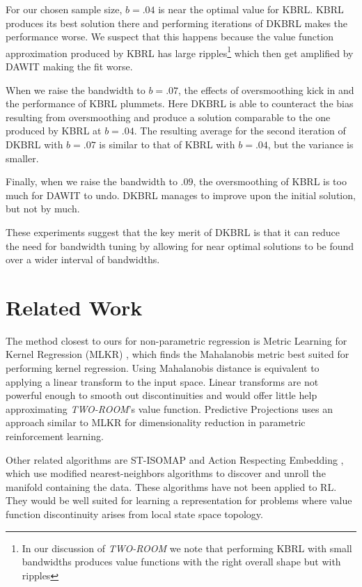 \documentclass{article} %
\begin{document}
For our chosen sample size, $b=.04$ is near the optimal value for KBRL.
KBRL produces its best solution there and performing iterations of DKBRL makes the performance worse.
We suspect that this happens because the value function approximation produced by
KBRL has large ripples\footnote{In our discussion of \textit{TWO-ROOM} we note that
performing KBRL with small bandwidths produces value functions with the right overall shape
but with ripples} which then get amplified by DAWIT making the fit worse.

When we raise the bandwidth to $b=.07$, the effects of oversmoothing kick in and the
performance of KBRL plummets. Here DKBRL is able to counteract the bias resulting from
oversmoothing and produce a solution comparable to the one produced by KBRL at $b=.04$.
The resulting average for the second iteration of DKBRL with $b=.07$ is similar to that of
KBRL with $b=.04$, but the variance is smaller.

Finally, when we raise the bandwidth to $.09$, the oversmoothing of KBRL is too much for DAWIT
to undo. DKBRL manages to improve upon the initial solution, but not by much.

These experiments suggest that the key merit of DKBRL is that it can reduce the need for bandwidth
tuning by allowing for near optimal solutions to be found over a wider interval of bandwidths.

\section{Related Work}

The method closest to ours for non-parametric regression is Metric Learning for Kernel Regression
(MLKR) \cite{mlkr},
which finds the Mahalanobis metric best suited for performing kernel regression.
Using Mahalanobis distance is equivalent to applying a linear transform to the input space.
Linear transforms are not powerful enough to smooth out discontinuities and would
offer little help approximating \textit{TWO-ROOM}'s value function. 
Predictive Projections \cite{sprague} uses an approach similar to MLKR for
dimensionality reduction in parametric reinforcement learning.

Other related algorithms are ST-ISOMAP \cite{jenkins} and Action Respecting
Embedding \cite{bowling}, which use modified nearest-neighbors algorithms to 
discover and unroll the manifold containing the data.
These algorithms have not been applied to RL.
They would be well suited for learning a representation for problems
where value function discontinuity arises from local state space topology.
\end{document}
